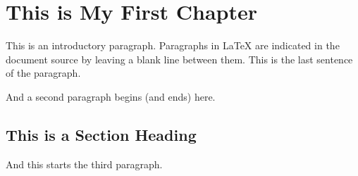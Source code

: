 \chapter{This is My First Chapter}

This is an introductory paragraph.  Paragraphs in \LaTeX{} are
indicated in the document source by leaving a blank line between
them.  This is the last sentence of the paragraph.

And a second paragraph begins (and ends) here.

\section{This is a Section Heading}

And this starts the third paragraph.
